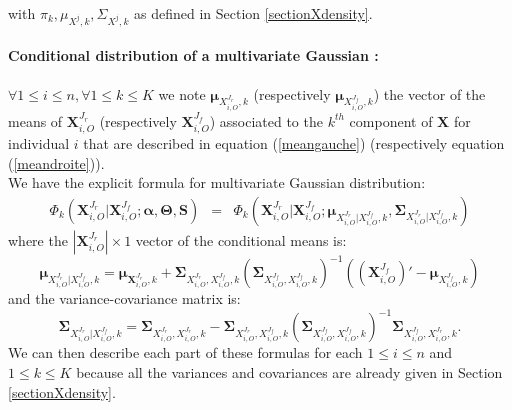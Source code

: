 \documentclass[12pt,a4paper]{report}
\begin{document}
		with $ \pi_k, \mu_{X^j,k},\Sigma_{X^j,k}$ as defined in Section \ref{sectionXdensity}.
		\paragraph{Conditional distribution of a multivariate Gaussian :}
		$\forall 1\leq i \leq n, \forall 1\leq k \leq K$ we note $ \boldsymbol{\mu}_{X^{J_r}_{i,O},k}$ (respectively $\boldsymbol{\mu}_{X^{J_f}_{i,O},k}$) the vector of the means of $\boldsymbol{X}^{J_r}_{i,O} $ (respectively  $\boldsymbol{X}^{J_f}_{i,O}$)  associated to the $k^{th}$ component of $\boldsymbol{X}$ for individual $i$ that are described in equation (\ref{meangauche}) (respectively equation (\ref{meandroite})).\\
		
		We have the explicit formula for multivariate Gaussian distribution:
\begin{eqnarray}
		\Phi_k(\boldsymbol{X}^{J_r}_{i,O}|\boldsymbol{X}^{J_f}_{i,O};\boldsymbol{\alpha},\boldsymbol{\Theta},\boldsymbol{S})&=&\Phi_k(\boldsymbol{X}^{J_r}_{i,O}|\boldsymbol{X}^{J_f}_{i,O};\boldsymbol{\mu}_{X^{J_r}_{i,O}|X^{J_f}_{i,O},k},\boldsymbol{\Sigma}_{X^{J_r}_{i,O}|X^{J_f}_{i,O},k}) \nonumber 
		\end{eqnarray}
				where the $|\boldsymbol{X}^{J_r}_{i,O}| \times 1$ vector of the conditional means is:
				\begin{equation}
		\boldsymbol{\mu}_{X^{J_r}_{i,O}|X^{J_f}_{i,O},k}= 
				\boldsymbol{\mu}_{\boldsymbol{X}^{J_r}_{i,O},k}+
				\boldsymbol{\Sigma}_{X_{i,O}^{J_r},X_{i,O}^{J_f},k}(\boldsymbol{\Sigma}_{X_{i,O}^{J_f},X_{i,O}^{J_f},k})^{-1}
				( (\boldsymbol{X}_{i,O}^{J_f})'-\boldsymbol{\mu}_{X^{J_f}_{i,O},k})  \nonumber 
				\end{equation}
				and the variance-covariance matrix is:
						\begin{equation}
\boldsymbol{\Sigma}_{X^{J_r}_{i,O}|X^{J_f}_{i,O},k}=\boldsymbol{\Sigma}_{X_{i,O}^{J_r},X_{i,O}^{J_r},k}-\boldsymbol{\Sigma}_{X_{i,O}^{J_r},X_{i,O}^{J_f},k}
		(\boldsymbol{\Sigma}_{X_{i,O}^{J_f},X_{i,O}^{J_f},k})^{-1} \boldsymbol{\Sigma}_{X_{i,O}^{J_f},X_{i,O}^{J_r},k}. \nonumber 
		\end{equation}
		We can then describe each part of these formulas for each $1\leq i \leq n$ and $1\leq k \leq K$ because all the variances and covariances are already given in Section \ref{sectionXdensity}.\\
\end{document}
